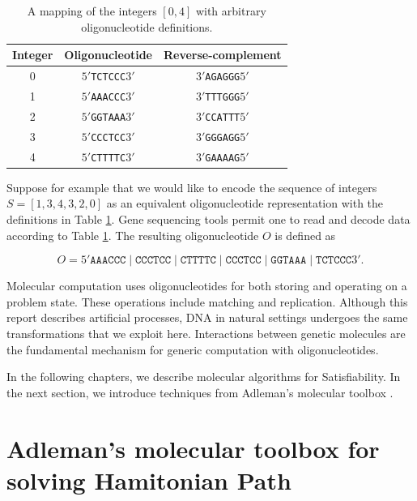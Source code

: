 \begin{table}[htdp]
\caption{A mapping of the integers $[0,4]$ with arbitrary oligonucleotide definitions.}
\begin{center}
\begin{tabular}{|c|c|c|}
\hline
 \textbf{Integer} & \textbf{Oligonucleotide} & \textbf{Reverse-complement}\\ \hline
0 & $5'$\texttt{TCTCCC}$3'$ & $3'$\texttt{AGAGGG}$5'$ \\
1 & $5'$\texttt{AAACCC}$3'$ & $3'$\texttt{TTTGGG}$5'$ \\
2 & $5'$\texttt{GGTAAA}$3'$ & $3'$\texttt{CCATTT}$5'$ \\
3 & $5'$\texttt{CCCTCC}$3'$ & $3'$\texttt{GGGAGG}$5'$ \\
4 & $5'$\texttt{CTTTTC}$3'$ & $3'$\texttt{GAAAAG}$5'$ \\ \hline
\end{tabular}
\end{center}
\label{integer2OligoTable}
\end{table}%

Suppose for example that we would like to encode the sequence of integers $S = [1, 3, 4, 3, 2, 0]$ as an equivalent oligonucleotide representation with the definitions in Table \ref{integer2OligoTable}.  Gene sequencing tools permit one to read and decode data according to Table \ref{integer2OligoTable}.  The resulting oligonucleotide $O$ is defined as

\[
O = 5'\texttt{AAACCC}\mid \texttt{CCCTCC}\mid \texttt{CTTTTC}\mid \texttt{CCCTCC}\mid \texttt{GGTAAA}\mid \texttt{TCTCCC}3'.
\]

Molecular computation uses oligonucleotides for both storing and operating on a problem state.  These operations include matching and replication.  Although this report describes artificial processes, DNA in natural settings undergoes the same transformations that we exploit here.  Interactions between genetic molecules are the fundamental mechanism for generic computation with oligonucleotides.
	
In the following chapters, we describe molecular algorithms for {\sc Satisfiability}.  In the next section, we introduce techniques from Adleman's molecular toolbox \cite{Adleman:1994:MCS:189441.189442}.

\section{Adleman's molecular toolbox for solving {\sc Hamitonian Path}}
	

